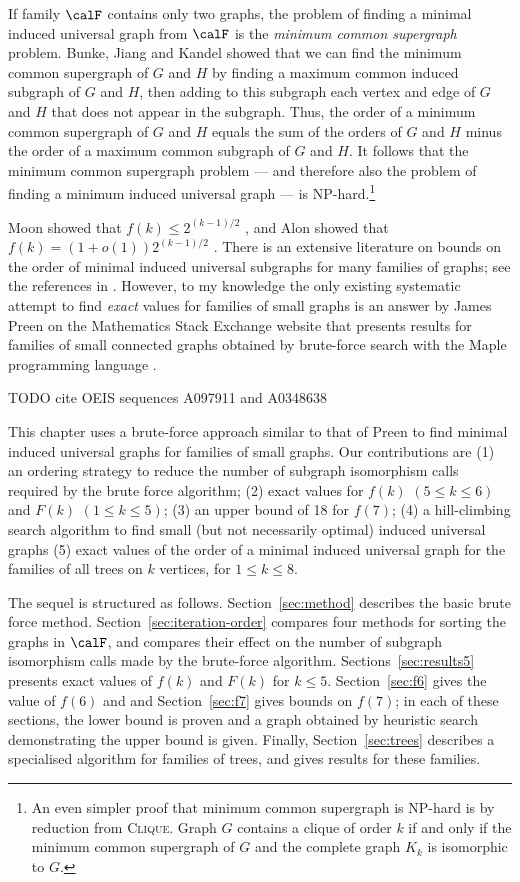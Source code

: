 If family $\calF$ contains only two graphs, the problem of finding a minimal
induced universal graph from $\calF$ is the \emph{minimum common supergraph}
problem.  Bunke, Jiang and Kandel \cite{DBLP:journals/computing/BunkeJK00}
showed that we can find the minimum common supergraph of $G$ and $H$ by
finding a maximum common induced subgraph of $G$ and $H$, then adding to this
subgraph each vertex and edge of $G$ and $H$ that does not appear in the subgraph.
Thus, the order of a minimum common supergraph of $G$ and $H$ equals the sum
of the orders of $G$ and $H$ minus the order of a maximum common subgraph
of $G$ and $H$.  It follows that the minimum common supergraph problem ---
and therefore also the problem of finding a minimum induced universal graph
--- is NP-hard.\footnote{An even simpler proof that minimum common supergraph
is NP-hard is by reduction from \textsc{Clique}.  Graph $G$ contains a clique
of order $k$ if and only if the minimum common supergraph of $G$ and
the complete graph $K_k$ is isomorphic to $G$.}

Moon showed that $f(k) \leq 2^{(k-1)/2}$
\cite{moon_1965}, and Alon showed that $f(k) = (1 + o(1))2^{(k-1)/2}$
\cite{alon2017asymptotically}.  There is an extensive literature on bounds on
the order of minimal induced universal subgraphs for many families of graphs;
see the references in \cite{alon2017asymptotically}.
However, to my knowledge the only
existing systematic attempt to find \emph{exact} values for families of small
graphs is an answer by James Preen on the Mathematics Stack Exchange website that
presents results for families of small connected graphs obtained by brute-force
search with the Maple programming language \cite{preen_math_se}.

TODO cite OEIS sequences
A097911 \cite{oeisA097911}
and
A0348638 \cite{oeisA348638}

This chapter uses a brute-force approach similar to that of Preen to find minimal
induced universal graphs for families of small graphs.  Our contributions
are (1) an ordering strategy to reduce the number of subgraph isomorphism
calls required by the brute force algorithm; (2) exact values for $f(k)$ $(5 \leq k \leq 6)$
and $F(k)$ $(1 \leq k \leq 5)$; (3) an upper bound of 18 for $f(7)$; (4) a hill-climbing
search algorithm to find small (but not necessarily optimal) induced universal graphs
(5) exact values of the order of a minimal induced universal graph
for the families of all trees on $k$ vertices, for $1 \leq k \leq 8$.

The sequel is structured as follows.
Section~\ref{sec:method} describes the basic brute force method.
Section~\ref{sec:iteration-order} compares four methods for sorting
the graphs in $\calF$, and compares their effect on the number of subgraph
isomorphism calls made by the brute-force algorithm.
Sections~\ref{sec:results5} presents exact
values of $f(k)$ and $F(k)$ for $k \leq 5$.
Section~\ref{sec:f6} gives the value of $f(6)$ and and
Section~\ref{sec:f7} gives bounds on $f(7)$; in each of these sections, the lower
bound is proven and a graph obtained by heuristic search demonstrating the
upper bound is given.  Finally, Section~\ref{sec:trees} describes a specialised
algorithm for families of trees, and gives results for
these families.

